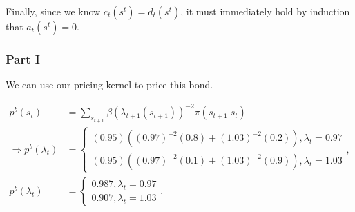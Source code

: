 \documentclass[11pt]{article} %
\begin{document}
Finally, since we know $c_t(s^t) = d_t(s^t)$, it must immediately hold by induction that $a_t(s^t) = 0.$

\subsubsection{Part I}
We can use our pricing kernel to price this bond.

\begin{align*}
p^b(s_t) &= \sum_{s_{t+1}} \beta  (\lambda_{t+1}(s_{t+1}))^{-2}\pi(s_{t+1}|s_t) \\
\Rightarrow p^b(\lambda_t) &= \begin{cases} (0.95) ((0.97)^{-2}(0.8) + (1.03)^{-2}(0.2) ) , \lambda_t = 0.97 \\ (0.95) ((0.97)^{-2}(0.1) + (1.03)^{-2}(0.9) ) , \lambda_t = 1.03\end{cases},\\
p^b(\lambda_t) &= \begin{cases} 0.987 , \lambda_t = 0.97 \\ 0.907 , \lambda_t = 1.03\end{cases}.
\end{align*}
\end{document}
